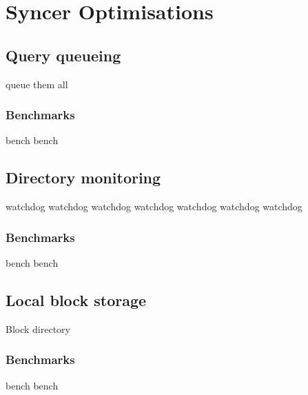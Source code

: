 
\chapter{Syncer Optimisations}


\section{Query queueing}
  queue them all
  \subsection{Benchmarks}
  bench bench

\section{Directory monitoring}
  watchdog watchdog watchdog watchdog watchdog watchdog watchdog
  \subsection{Benchmarks}
  bench bench

\section{Local block storage}
  Block directory
  \subsection{Benchmarks}
  bench bench
